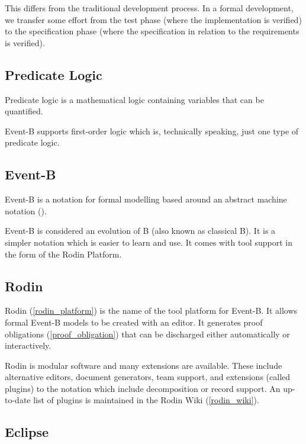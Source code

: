 This differs from the traditional development process. In a formal development, we transfer some effort from the test phase (where the implementation is verified) to the specification phase (where the specification in relation to the requirements is verified).

\subsection{Predicate Logic}
\label{predicate_logic}

Predicate logic is a mathematical logic containing variables that can be quantified.

Event-B supports first-order logic which is, technically speaking, just one type of predicate logic.  

\subsection{Event-B}
\label{eventb}

Event-B is a notation for formal modelling based around an abstract machine notation ().

Event-B is considered an evolution of B (also known as classical B). It is a simpler notation which is easier to learn and use. It comes with tool support in the form of the Rodin Platform.

\subsection{Rodin}

Rodin (\ref{rodin_platform}) is the name of the tool platform for Event-B.  It allows formal Event-B models to be created with an editor.  It generates proof obligations (\ref{proof_obligation}) that can be discharged either automatically or interactively.

Rodin is modular software and many extensions are available.  These include alternative editors, document generators, team support, and extensions (called plugins) to the notation which include decomposition or record support.  An up-to-date list of plugins is maintained in the Rodin Wiki (\ref{rodin_wiki}).

\subsection{Eclipse} \label{subsection_eclipse}

